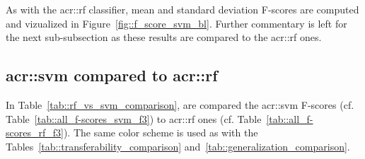         As with the \gls{acr::rf} classifier, mean and standard deviation F-scores are computed and vizualized in Figure~\ref{fig::f_score_svm_bl}.
        Further commentary is left for the next sub-subsection as these results are compared to the \gls{acr::rf} ones.

        \begin{figure}[htpb]
            \centering
        \end{figure}

    \subsection{\texorpdfstring{\acrshort*{acr::svm}}{SVM} compared to \texorpdfstring{\acrshort*{acr::rf}}{RF}}
        \label{subsec::advanced_experiments::classifier::svm_rf}
        In Table~\ref{tab::rf_vs_svm_comparison}, are compared the \gls{acr::svm} F-scores (cf. Table~\ref{tab::all_f-scores_svm_f3}) to \gls{acr::rf} ones (cf. Table~\ref{tab::all_f-scores_rf_f3}).
        The same color scheme is used as with the Tables~\ref{tab::transferability_comparison} and~\ref{tab::generalization_comparison}.\\

